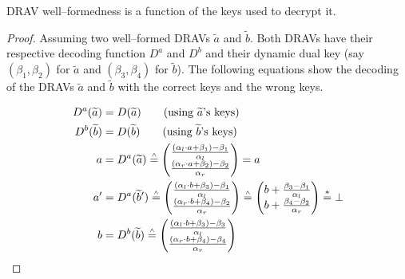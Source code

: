 \begin{lem}
  \label{lem:well-formed-fun-of-dec-fun}

  DRAV well--formedness is a function of the keys used to decrypt it.

\end{lem}
\begin{proof}

  Assuming two well--formed DRAVs $\widetilde{a}$ and $\widetilde{b}$. Both
  DRAVs have their respective decoding function $D^a$ and $D^b$ and their
  dynamic dual key (say $(\beta_1, \beta_2)$ for $\widetilde{a}$ and
  $(\beta_3, \beta_4)$ for $\widetilde{b}$). The following equations show
  the decoding of the DRAVs $\widetilde{a}$ and $\widetilde{b}$ with the correct
  keys and the wrong keys.

  \begin{align*}
    D^a(\widetilde{a}) &= D(\widetilde{a}) \qquad\text{(using $\widetilde{a}$'s
    keys)}\\
    D^b(\widetilde{b}) &= D(\widetilde{b}) \qquad\text{(using $\widetilde{b}$'s
    keys)}\\
    a &= D^a(\widetilde{a}) \stackrel{\scriptscriptstyle\wedge}{=}
    \begin{pmatrix}
      \frac{(\alpha_l \cdot a + \beta_1) - \beta_1}{\alpha_l}\\
      \frac{(\alpha_r \cdot a + \beta_2) - \beta_2}{\alpha_r}\\
    \end{pmatrix}
    = a\\
    a' &= D^a(\widetilde{b}')
    \stackrel{\scriptscriptstyle\wedge}{=}
    \begin{pmatrix}
      \frac{(\alpha_l \cdot b + \beta_3) - \beta_1}{\alpha_l}\\
      \frac{(\alpha_r \cdot b + \beta_4) - \beta_2}{\alpha_r}\\
    \end{pmatrix}
    \stackrel{\scriptscriptstyle\wedge}{=}
    \begin{pmatrix}
      b +
      \frac{\beta_3 - \beta_1}{\alpha_l}\\
      b +
      \frac{\beta_4 - \beta_2}{\alpha_r}\\
    \end{pmatrix}
    \stackrel{*}{=} \bot\\
    b &= D^b(\widetilde{b}) \stackrel{\scriptscriptstyle\wedge}{=}
    \begin{pmatrix}
      \frac{(\alpha_l \cdot b + \beta_3) - \beta_3}{\alpha_l}\\
      \frac{(\alpha_r \cdot b + \beta_4) - \beta_4}{\alpha_r}\\

\end{pmatrix}
\end{align*}
\end{proof}
